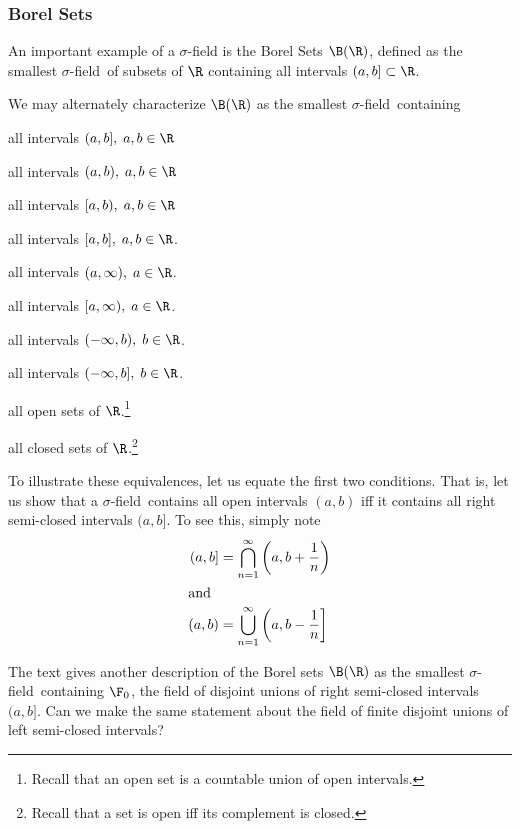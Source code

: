 \documentclass{article} %
\renewcommand{\sf}{$\sigma$-field}
\begin{document}
\subsubsection{Borel Sets} \label{sec:borel_sets}

An important example of a $\sigma$-field is the Borel Sets $\B(\R)$, defined as the smallest \sf\ of subsets of $\R$ containing all intervals $(a,b] \subset \R$.  

We may alternately characterize $\B(\R)$ as the smallest \sf\ containing
\begin{alphabate}
\item all intervals $(a,b], \; a,b \in \R$
\item all intervals $(a,b), \; a,b \in \R$
\item all intervals $[a,b), \; a,b \in \R$
\item all intervals $[a,b], \; a,b \in \R$.
\item all intervals $(a,\infty), \; a \in \R$.
\item  all intervals $[a,\infty), \; a \in \R$.
\item 	 all intervals $(-\infty,b), \; b \in \R$.
\item  all intervals $(-\infty,b], \; b \in \R$.
\item all open sets of $\R$.\footnote{Recall that an open set is a countable union of open intervals.}
\item all closed sets of $\R$.\footnote{Recall that a set is open iff its complement is closed.}
\end{alphabate}

To illustrate these equivalences, let us equate the first two conditions. That is, let us show that a \sf\ contains all open intervals $(a,b)$ iff it contains all right semi-closed intervals $(a,b]$.  To see this, simply note
\begin{subequations}
\begin{align}
(a,b] &= \bigcap_{n=1}^\infty \bigg(a, b+\frac{1}{n}\bigg) \\
	\intertext{and}
(a,b) &= \bigcup_{n=1}^\infty \bigg(a, b-\frac{1}{n}\bigg] 
\end{align}
\label{eqn:open_intervals_as_rsc_intervals_and_vice_versa}
\end{subequations}

\begin{question}
The text gives another description of the Borel sets $\B(\R)$ as the smallest \sf\ containing $\F_0$, the field of disjoint unions of right semi-closed intervals $(a,b]$.  Can we make the same statement about the field of finite disjoint unions of left semi-closed intervals?
\end{question}
\end{document}
